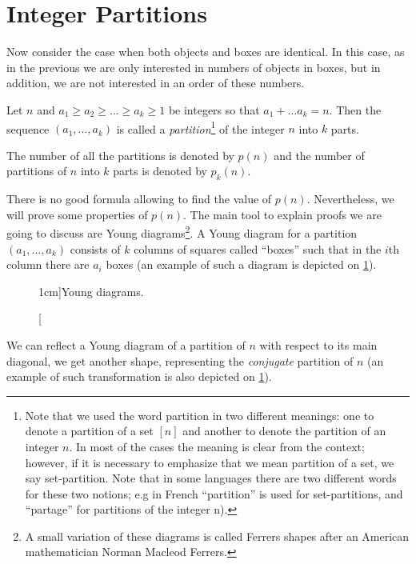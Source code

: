 \section{Integer Partitions}
Now consider the case when both objects and boxes are identical. In this case,
as in the previous we are only interested in numbers of objects in boxes, but
in addition, we are not interested in an order of these numbers.

\begin{definition}
  Let $n$ and $a_1 \ge a_2 \ge \dots \ge a_k \ge 1$ be integers so that
  $a_1 + \dots a_k = n$. Then the sequence $(a_1, \dots, a_k)$ is called
  a \emph{partition}\footnote[][-3cm]{%
    Note that we used the word partition in two different meanings: one to
    denote a partition of a set $[n]$ and another to denote the partition of
    an integer $n$. In most of the cases the meaning is clear from the context;
    however, if it is necessary to emphasize that we mean partition of a set,
    we say set-partition. Note that in some languages there are two different
    words for these two notions; e.g in French ``partition'' is used for
    set-partitions, and ``partage'' for partitions of the integer n).
  } of the integer $n$ into $k$ parts.

  The number of all the partitions is denoted by $p(n)$ and the number of
  partitions of $n$ into $k$ parts is denoted by $p_k(n)$.
\end{definition}



There is no good formula allowing to find the value of $p(n)$. Nevertheless, we will
prove some properties of $p(n)$. The main tool to explain proofs we are going to
discuss are Young diagrams\footnote{%
  A small variation of these diagrams is called Ferrers shapes after an
  American mathematician Norman Macleod Ferrers.
}.
A Young diagram for a partition $(a_1, \dots, a_k)$ consists of $k$ columns of
squares called ``boxes'' such that in the $i$th column there are $a_i$ boxes
(an example of such a diagram is depicted on \ref{figure:young-diagram-example}).
\begin{figure}
  \centering
  \qquad\qquad
  \caption[][1cm]{Young diagrams.}
  \label{figure:young-diagram-example}
\end{figure}
We can reflect a Young diagram of a partition of $n$ with respect to its main
diagonal, we get another shape, representing the \emph{conjugate} partition of
$n$ (an example of such transformation is also depicted on
\ref{figure:young-diagram-example}).

